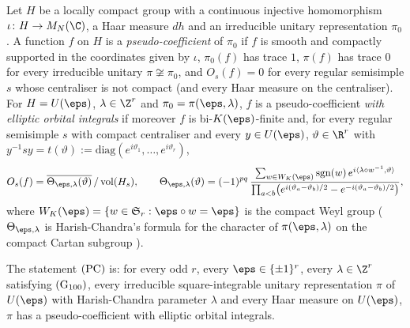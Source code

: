 \begin{definition}\label{pf:multnc:def-pc}
Let $H$ be a locally compact group with a continuous injective homomorphism $\iota\colon H\to M_N(\C)$, a Haar measure
$dh$ and an irreducible unitary representation $\pi_0$. A function $f$ on $H$ is a \emph{pseudo-coefficient} of $\pi_0$ if
$f$ is smooth and compactly supported in the coordinates given by $\iota$, $\pi_0(f)$ has trace $1$, $\pi(f)$ has trace
$0$ for every irreducible unitary $\pi\not\cong\pi_0$, and $O_s(f)=0$ for every regular semisimple $s$ whose centraliser is
not compact (and every Haar measure on the centraliser). For $H=U(\eps)$, $\lambda\in\Z^r$ and $\pi_0=\pi(\eps,\lambda)$,
$f$ is a pseudo-coefficient \emph{with elliptic orbital integrals} if moreover $f$ is bi-$K(\eps)$-finite and, for every
regular semisimple $s$ with compact centraliser and every $y\in U(\eps)$, $\vartheta\in\R^r$ with
$y^{-1}sy=t(\vartheta):=\mathrm{diag}(e^{i\vartheta_1},\dots,e^{i\vartheta_r})$,
\begin{equation}\label{pf:multnc:eq-orbell}
O_s(f)=\overline{\Theta_{\eps,\lambda}(\vartheta)}\,/\,\mathrm{vol}(H_s),\qquad
\Theta_{\eps,\lambda}(\vartheta)=(-1)^{pq}\,\frac{\sum_{w\in W_K(\eps)}\mathrm{sgn}(w)\,
e^{i\langle\lambda\circ w^{-1},\vartheta\rangle}}{\prod_{a<b}\bigl(e^{i(\vartheta_a-\vartheta_b)/2}-
e^{-i(\vartheta_a-\vartheta_b)/2}\bigr)},
\end{equation}
where $W_K(\eps)=\{w\in\mathfrak S_r:\eps\circ w=\eps\}$ is the compact Weyl group ($\Theta_{\eps,\lambda}$ is
Harish-Chandra's formula for the character of $\pi(\eps,\lambda)$ on the compact Cartan subgroup \cite{HarishChandra1966}).
\end{definition}

\begin{definition}\label{pf:multnc:def-localpc}
The statement $\textup{(PC)}$ is: for every odd $r$, every $\eps\in\{\pm1\}^r$, every $\lambda\in\Z^r$ satisfying
$\textup{(G$_{100}$)}$, every irreducible square-integrable unitary representation $\pi$ of $U(\eps)$ with Harish-Chandra
parameter $\lambda$ and every Haar measure on $U(\eps)$, $\pi$ has a pseudo-coefficient with elliptic orbital integrals.
\end{definition}

